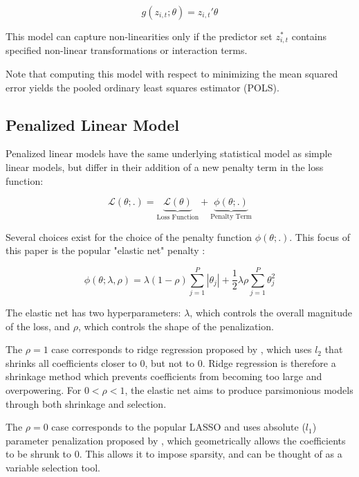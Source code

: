 \documentclass[a4paper, table]{article}
\begin{document}
\begin{equation}
	g(z_{i, t};\theta) = z_{i, t}' \theta
\end{equation}

This model can capture non-linearities only if the predictor set \(z^*_{i, t}\) contains specified non-linear transformations or interaction terms. 

Note that computing this model with respect to minimizing the mean squared error yields the pooled ordinary least squares estimator (POLS).

\subsection{Penalized Linear Model}

Penalized linear models have the same underlying statistical model as simple linear models, but differ in their addition of a new penalty term in the loss function:

\begin{equation}
	\mathcal{L(\theta;.)} = 
	\underset{\text{Loss Function}}{\underbrace{\mathcal{L(\theta)}}} + 
	\underset{\text{Penalty Term}}{\underbrace{\phi(\theta;.)}}
\end{equation}

Several choices exist for the choice of the penalty function \( \phi(\theta;.) \). This focus of this paper is the popular "elastic net" penalty \citep{zou_regularization_2005}:

\begin{equation}
	\phi(\theta;\lambda,\rho) = 
	\lambda(1-\rho) \sum_{j = 1}^{P}|\theta_j| +
	\frac{1}{2} \lambda \rho \sum_{j = 1}^{P}\theta_j^2
\end{equation}

The elastic net has two hyperparameters: $\lambda$, which controls the overall magnitude of the loss, and $\rho$, which controls the shape of the penalization. 

The $\rho = 1$ case corresponds to ridge regression proposed by \cite{hoerl_ridge_1970}, which uses $l_2$ that shrinks all coefficients closer to 0, but not to 0. Ridge regression is therefore a shrinkage method which prevents coefficients from becoming too large and overpowering. For \(0 < \rho < 1\), the elastic net aims to produce parsimonious models through both shrinkage and selection.

The $\rho = 0$ case corresponds to the popular LASSO and uses absolute ($l_1$) parameter penalization proposed by \cite{tibshirani_regression_1996}, which geometrically allows the coefficients to be shrunk to 0. This allows it to impose sparsity, and can be thought of as a variable selection tool.
\end{document}
